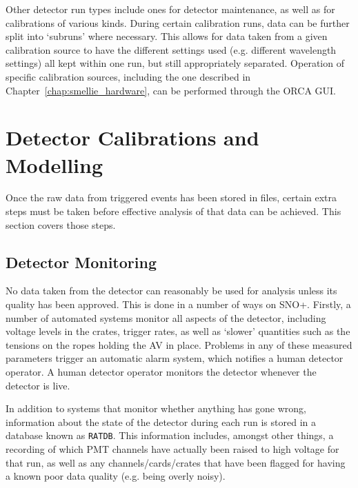 Other detector run types include ones for detector maintenance, as well as for calibrations of various kinds. During certain calibration runs, data can be further split into `subruns' where necessary. This allows for data taken from a given calibration source to have the different settings used (e.g. different wavelength settings) all kept within one run, but still appropriately separated. Operation of specific calibration sources, including the one described in Chapter~\ref{chap:smellie_hardware}, can be performed through the ORCA GUI.


\section{Detector Calibrations and Modelling}\label{sec:calibs_modelling}
Once the raw data from triggered events has been stored in files, certain extra steps must be taken before effective analysis of that data can be achieved. This section covers those steps.

\subsection{Detector Monitoring}
No data taken from the detector can reasonably be used for analysis unless its quality has been approved. This is done in a number of ways on SNO+. Firstly, a number of automated systems monitor all aspects of the detector, including voltage levels in the crates, trigger rates, as well as `slower' quantities such as the tensions on the ropes holding the AV in place. Problems in any of these measured parameters trigger an automatic alarm system, which notifies a human detector operator. A human detector operator monitors the detector whenever the detector is live.

In addition to systems that monitor whether anything has gone wrong, information about the state of the detector during each run is stored in a database known as \texttt{RATDB}. This information includes, amongst other things, a recording of which PMT channels have actually been raised to high voltage for that run, as well as any channels/cards/crates that have been flagged for having a known poor data quality (e.g. being overly noisy).


